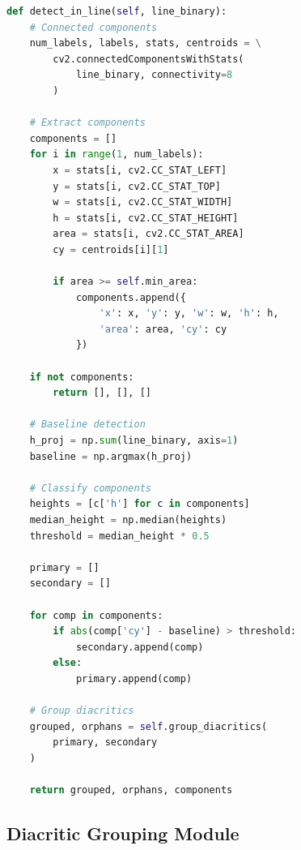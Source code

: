 \documentclass[12pt,a4paper,oneside]{report}
\begin{document}
\begin{lstlisting}[language=Python, caption=Character Detection Implementation]
def detect_in_line(self, line_binary):
    # Connected components
    num_labels, labels, stats, centroids = \
        cv2.connectedComponentsWithStats(
            line_binary, connectivity=8
        )
    
    # Extract components
    components = []
    for i in range(1, num_labels):
        x = stats[i, cv2.CC_STAT_LEFT]
        y = stats[i, cv2.CC_STAT_TOP]
        w = stats[i, cv2.CC_STAT_WIDTH]
        h = stats[i, cv2.CC_STAT_HEIGHT]
        area = stats[i, cv2.CC_STAT_AREA]
        cy = centroids[i][1]
        
        if area >= self.min_area:
            components.append({
                'x': x, 'y': y, 'w': w, 'h': h,
                'area': area, 'cy': cy
            })
    
    if not components:
        return [], [], []
    
    # Baseline detection
    h_proj = np.sum(line_binary, axis=1)
    baseline = np.argmax(h_proj)
    
    # Classify components
    heights = [c['h'] for c in components]
    median_height = np.median(heights)
    threshold = median_height * 0.5
    
    primary = []
    secondary = []
    
    for comp in components:
        if abs(comp['cy'] - baseline) > threshold:
            secondary.append(comp)
        else:
            primary.append(comp)
    
    # Group diacritics
    grouped, orphans = self.group_diacritics(
        primary, secondary
    )
    
    return grouped, orphans, components
\end{lstlisting}

\subsection{Diacritic Grouping Module}
\end{document}
